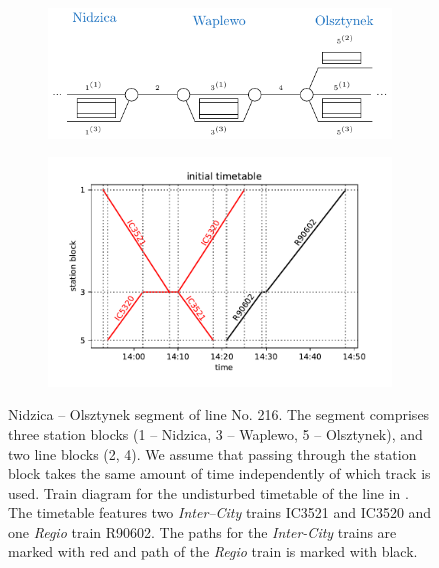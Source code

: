 \begin{figure}
  \begin{subfigure}{\textwidth}
    \caption{}\label{fig:linesmall:line}
    \includegraphics[width=\textwidth]{figures/line_small.pdf}
  \end{subfigure}
  \begin{subfigure}{\textwidth}
    \caption{}\label{fig:linesmall:diagram}
    \includegraphics[width=\textwidth]{figures/train_diagram_small}
  \end{subfigure}
  \caption{ Nidzica -- Olsztynek segment of line No. 216. The segment comprises three
    station blocks (1 -- Nidzica, 3 -- Waplewo, 5 -- Olsztynek), and two line
    blocks (2, 4). We assume that passing through the station block takes the same
    amount of time independently of which track is used.  Train diagram for the undisturbed timetable of the line in . The timetable features two
    \emph{Inter--City} trains IC3521 and IC3520 and one \emph{Regio} train R90602. The paths for the
    \emph{Inter-City} trains are marked with red and path of the \emph{Regio} train is marked with black.}
  \label{fig:linesmall}
\end{figure}

